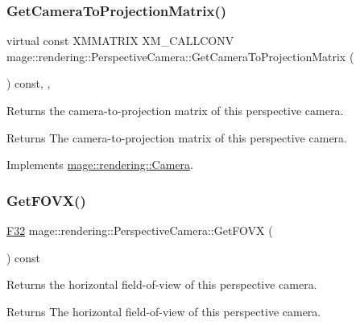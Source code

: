 \subsubsection{\texorpdfstring{Get\+Camera\+To\+Projection\+Matrix()}{GetCameraToProjectionMatrix()}}
{\footnotesize\ttfamily virtual const X\+M\+M\+A\+T\+R\+IX X\+M\+\_\+\+C\+A\+L\+L\+C\+O\+NV mage\+::rendering\+::\+Perspective\+Camera\+::\+Get\+Camera\+To\+Projection\+Matrix (\begin{DoxyParamCaption}{ }\end{DoxyParamCaption}) const\hspace{0.3cm}{\ttfamily [override]}, {\ttfamily [virtual]}, {\ttfamily [noexcept]}}

Returns the camera-\/to-\/projection matrix of this perspective camera.

\begin{DoxyReturn}{Returns}
The camera-\/to-\/projection matrix of this perspective camera. 
\end{DoxyReturn}


Implements \hyperlink{classmage_1_1rendering_1_1_camera_a08481175c3718a24333b22176e240d44}{mage\+::rendering\+::\+Camera}.

\hypertarget{classmage_1_1rendering_1_1_perspective_camera_a3308ee4d7ec6830c04ed3f4fc01f81ac}{}\label{classmage_1_1rendering_1_1_perspective_camera_a3308ee4d7ec6830c04ed3f4fc01f81ac} 
\subsubsection{\texorpdfstring{Get\+F\+O\+V\+X()}{GetFOVX()}}
{\footnotesize\ttfamily \hyperlink{namespacemage_aa97e833b45f06d60a0a9c4fc22ae02c0}{F32} mage\+::rendering\+::\+Perspective\+Camera\+::\+Get\+F\+O\+VX (\begin{DoxyParamCaption}{ }\end{DoxyParamCaption}) const\hspace{0.3cm}{\ttfamily [noexcept]}}

Returns the horizontal field-\/of-\/view of this perspective camera.

\begin{DoxyReturn}{Returns}
The horizontal field-\/of-\/view of this perspective camera. 
\end{DoxyReturn}
\hypertarget{classmage_1_1rendering_1_1_perspective_camera_ae6be4458a427e626ec7299c5898ffd38}{}\label{classmage_1_1rendering_1_1_perspective_camera_ae6be4458a427e626ec7299c5898ffd38} 

